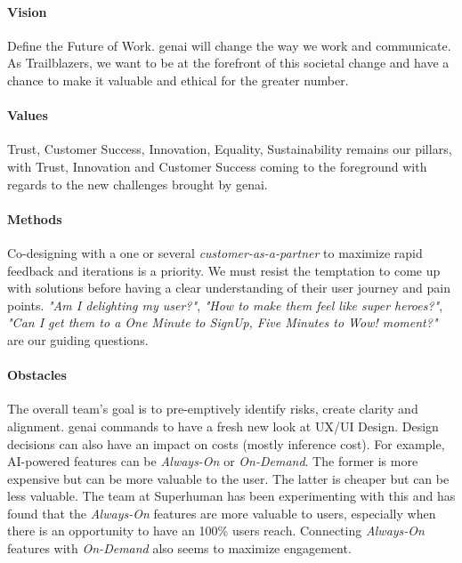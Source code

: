 \documentclass{tufte-handout}
\begin{document}
\paragraph{Vision}\label{sec:vision} Define the Future of Work. \gls{genai} will change the way we work and communicate. As Trailblazers, we want to be at the forefront of this societal change and have a chance to make it valuable and ethical for the greater number.

\paragraph{Values}\label{sec:values} Trust, Customer Success, Innovation, Equality, Sustainability remains our pillars, with Trust, Innovation and Customer Success coming to the foreground with regards to the new challenges brought by \gls{genai}.

\paragraph{Methods}\label{sec:methods} Co-designing with a one or several \textit{customer-as-a-partner} to maximize rapid feedback and iterations is a priority. We must resist the temptation to come up with solutions before having a clear understanding of their user journey and pain points. \emph{"Am I delighting my user?"}, \emph{"How to make them feel like super heroes?"}, \emph{"Can I get them to a One Minute to SignUp, Five Minutes to Wow! moment?"} are our guiding questions.\par


\paragraph{Obstacles}\label{sec:obstacles} The overall team's goal is to pre-emptively identify risks, create clarity and alignment. 
\gls{genai} commands to have a fresh new look at UX/UI Design. Design decisions can also have an impact on costs (mostly inference cost). For example, AI-powered features can be \emph{Always-On} or \emph{On-Demand}. The former is more expensive but can be more valuable to the user. The latter is cheaper but can be less valuable. The team at Superhuman has been experimenting with this and has found that the \emph{Always-On} features are more valuable to users, especially when there is an opportunity to have an 100\% users reach. Connecting \emph{Always-On} features with \emph{On-Demand} also seems to maximize engagement.
\end{document}
